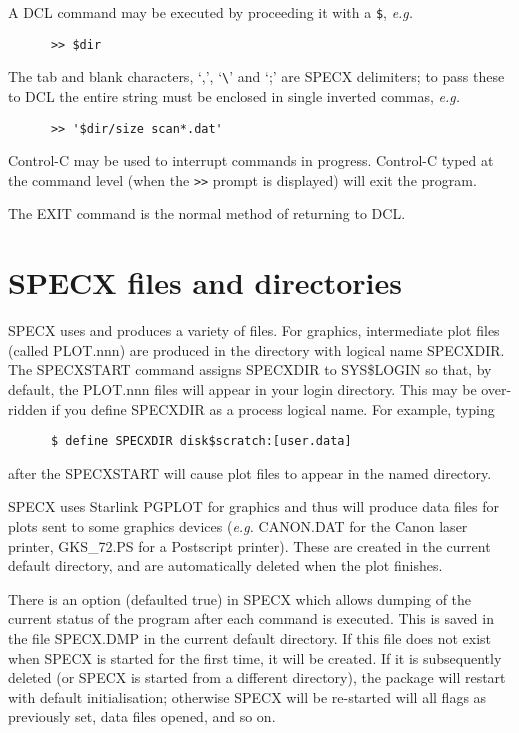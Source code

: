 A DCL command may be executed by proceeding it with a {\tt \$}, {\em e.g.}

\begin{verbatim}
      >> $dir
\end{verbatim}

The tab and blank characters, `,', `\verb+\+' and `;' are SPECX delimiters;
to pass these to DCL the entire string must be enclosed in single 
inverted commas, {\em e.g.}

\begin{verbatim}
      >> '$dir/size scan*.dat'
\end{verbatim}

Control-C may be 
used to interrupt commands in progress.
Control-C typed at the command level (when the
{\tt>>} prompt is displayed) will exit the program.

The EXIT command is the normal method of returning to DCL.

\section {SPECX files and directories}

SPECX uses and produces a variety of files. For graphics, 
intermediate plot files (called PLOT.nnn) are produced in the directory 
with logical name SPECXDIR. The SPECXSTART command assigns 
SPECXDIR to SYS\$LOGIN so that, 
by default, the PLOT.nnn files will appear in 
your login directory. This may be over-ridden if you define 
SPECXDIR as a process logical name. For example, typing

\begin{verbatim}
      $ define SPECXDIR disk$scratch:[user.data]
\end{verbatim}

after the SPECXSTART will cause plot files to appear in the named directory.

SPECX uses Starlink PGPLOT for graphics  and thus will produce data  files for
plots sent to some graphics devices ({\em e.g.} CANON.DAT for the Canon laser
printer, GKS\_72.PS for a Postscript printer). These are created in the current
default  directory, and are automatically deleted when the plot finishes.

There is an option (defaulted true) in SPECX which  allows dumping of the
current status of the program after each  command is executed. This is saved in
the file SPECX.DMP in the  current default directory. If this file does not
exist when SPECX  is started for the first time, it will be created. If it is 
subsequently deleted (or SPECX is started from a different  directory), the
package will restart with default initialisation; otherwise SPECX will be
re-started will all flags as previously  set, data files opened, and so on. 


